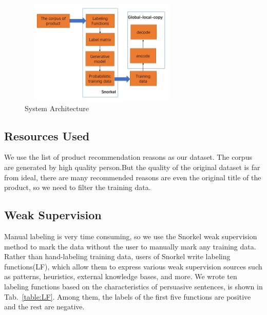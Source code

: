 \documentclass[sigconf]{acmart}
\begin{document}
\begin{figure}
    \centering
    \includegraphics[width=8cm,height=5cm]{system-architecture.jpg}
\caption{System Architecture}\label{fig:system-architecture}
\end{figure}

\subsection{Resources Used}
We use the list of product recommendation reasons as our dataset. The corpus are generated by high quality person.But the quality of the original dataset is far from ideal, there are many recommended reasons are even the original title of the product, so we need to filter the training data.

\subsection{Weak Supervision}
Manual labeling is very time consuming, so we use the Snorkel \cite{ratner2017snorkel} weak supervision method to mark the data without the user to manually mark any training data. Rather than hand-labeling training data, users of Snorkel write labeling functions(LF), which allow them to express various weak supervision sources such as patterns, heuristics, external knowledge bases, and more. We wrote ten labeling functions based on the characteristics of persuasive sentences, is shown in Tab.~\ref{table:LF}. Among them, the labels of the first five functions are positive and the rest are negative.
\end{document}
